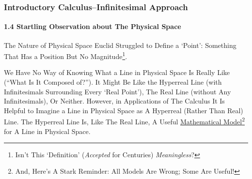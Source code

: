 \begin{frame}
\frametitle{Introductory Calculus--Infinitesimal Approach}
\framesubtitle{1.4 Startling Observation about \alert{The Physical Space}}
\label{slide:1.4-08}
\begin{block}{The Nature of Physical Space}
Euclid Struggled to Define \alert{a `Point': Something That Has a Position But No Magnitude\footnote{Isn't This `Definition' (\textit{Accepted} for Centuries) \textit{Meaningless}?}}.

We Have No Way of Knowing What a Line in Physical Space Is Really Like (``What Is It Composed of?''). It Might Be Like the Hyperreal Line (with Infinitesimals Surrounding Every `Real Point'), The Real Line (without Any Infinitesimals), Or Neither. \alert{However, in Applications of The Calculus It Is Helpful to Imagine a Line in Physical Space as A Hyperreal (Rather Than Real) Line. The Hyperreal Line Is, Like The Real Line, A Useful \underline{Mathematical Model}\footnote{And, Here's A Stark Reminder: All Models Are Wrong; Some Are Useful!} for A Line in Physical Space.}
\end{block}
\end{frame}
